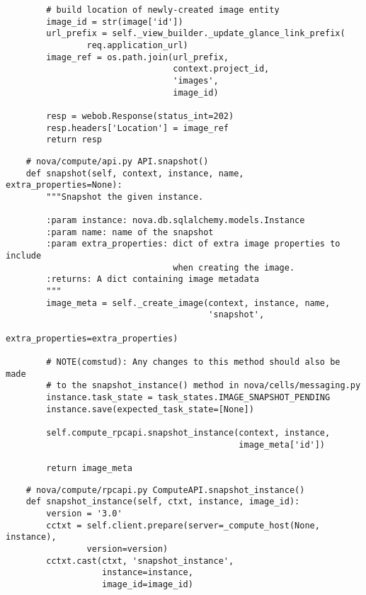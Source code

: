 \documentclass[a4paper,left=1.5cm,right=1.5cm,11pt]{article}
\begin{document}
\begin{lstlisting}
        # build location of newly-created image entity
        image_id = str(image['id'])
        url_prefix = self._view_builder._update_glance_link_prefix(
                req.application_url)
        image_ref = os.path.join(url_prefix,
                                 context.project_id,
                                 'images',
                                 image_id)

        resp = webob.Response(status_int=202)
        resp.headers['Location'] = image_ref
        return resp
    \end{lstlisting}

    \begin{lstlisting}
    # nova/compute/api.py API.snapshot()
    def snapshot(self, context, instance, name, extra_properties=None):
        """Snapshot the given instance.

        :param instance: nova.db.sqlalchemy.models.Instance
        :param name: name of the snapshot
        :param extra_properties: dict of extra image properties to include
                                 when creating the image.
        :returns: A dict containing image metadata
        """
        image_meta = self._create_image(context, instance, name,
                                        'snapshot',
                                        extra_properties=extra_properties)

        # NOTE(comstud): Any changes to this method should also be made
        # to the snapshot_instance() method in nova/cells/messaging.py
        instance.task_state = task_states.IMAGE_SNAPSHOT_PENDING
        instance.save(expected_task_state=[None])

        self.compute_rpcapi.snapshot_instance(context, instance,
                                              image_meta['id'])

        return image_meta
    \end{lstlisting}

    \begin{lstlisting}
    # nova/compute/rpcapi.py ComputeAPI.snapshot_instance()
    def snapshot_instance(self, ctxt, instance, image_id):
        version = '3.0'
        cctxt = self.client.prepare(server=_compute_host(None, instance),
                version=version)
        cctxt.cast(ctxt, 'snapshot_instance',
                   instance=instance,
                   image_id=image_id)
    \end{lstlisting}
\end{document}
